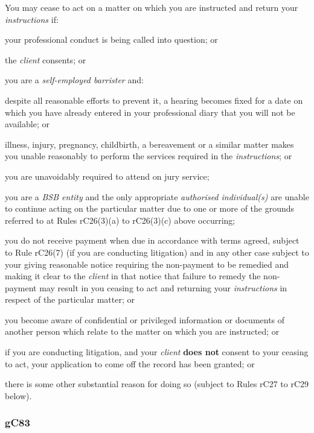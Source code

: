 You may cease to act on a matter on which you are instructed and return
your \emph{instructions} if:
\begin{numlist}\item your professional conduct is being called into question; or
\item the \emph{client} consents; or
\item you are a \emph{self-employed barrister} and:
\begin{alphlist}\item despite all reasonable efforts to prevent it, a hearing becomes fixed
for a date on which you have already entered in your professional diary
that you will not be available; or
\item illness, injury, pregnancy, childbirth, a bereavement or a similar
matter makes you unable reasonably to perform the services required in
the \emph{instructions}; or
\item you are unavoidably required to attend on jury service;\end{alphlist}
\item you are a \emph{BSB entity} and the only appropriate \emph{authorised
individual(s)} are unable to continue acting on the particular matter
due to one or more of the grounds referred to at Rules rC26(3)(a) to
rC26(3)(c) above occurring;
\item you do not receive payment when due in accordance with terms agreed,
subject to Rule rC26(7) (if you are conducting litigation) and in any
other case subject to your giving reasonable notice requiring the
non-payment to be remedied and making it clear to the \emph{client} in
that notice that failure to remedy the non-payment may result in you
ceasing to act and returning your \emph{instructions} in respect of the
particular matter; or
\item you become aware of confidential or privileged information or
documents of another person which relate to the matter on which you are
instructed; or
\item if you are conducting litigation, and your \emph{client} \textcolor{myred}{\textbf{does not}}
consent to your ceasing to act, your application to come off the record
has been granted; or
\item there is some other substantial reason for doing so (subject to Rules
rC27 to rC29 below).
\end{numlist}




\subsubsection{\color{darkgrey}gC83}

